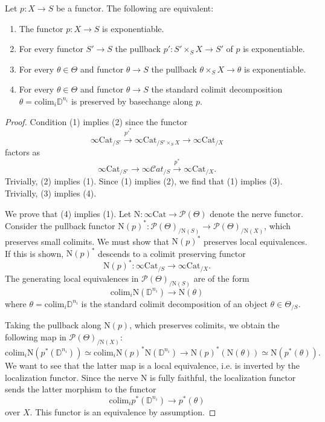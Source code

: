 \documentclass[10pt,oneside]{article}
\numberwithin{equation}{section} %
\numberwithin{figure}{section} %
\theoremstyle{plain}
\theoremstyle{definition}
\newcommand{\bD}{{\mathbb D}}
\newcommand{\mP}{{\mathcal P}}
\newcommand{\N}{{\mathrm N}}
\newcommand{\colim}{\mathrm{colim}}
\newcommand{\Cat}{\mathrm{Cat}}
\newcommand{\scat}{\mathcal{C}\mathit{at}}
\begin{document}
\begin{proposition}\label{checkontheta}\label{expbase}
Let $p:X\to S$ be a functor.
The following are equivalent:

\begin{enumerate}[\normalfont(1)]\setlength{\itemsep}{-2pt}
\item The functor $p:X\to S$ is exponentiable.

\item For every functor $S' \to S$ the pullback $p':S' \times_S X\to S' $ of $p$ is exponentiable.

\item For every $\theta \in \Theta$ and functor $\theta\to S$ the pullback $ \theta \times_S X \to \theta$ is exponentiable.

\item For every $\theta \in \Theta$ and functor $\theta\to S$ the standard colimit decomposition $\theta=\colim_i\bD^{n_i}$ is preserved by basechange along $p$. 

\end{enumerate}
\end{proposition}

\begin{proof}

Condition (1) implies (2) since the functor $$\infty\Cat_{/S'}\xrightarrow{{p'}^*} \infty\Cat_{/S' \times_S X} \to \infty\Cat_{/X}$$ factors as
$$\infty\Cat_{/S'}\to \infty\scat_{/S} \xrightarrow{p^*} \infty\Cat_{/X}.$$
Trivially, (2) implies (1).
Since (1) implies (2), we find that (1) implies (3).
Trivially, (3) implies (4).

We prove that (4) implies (1).
Let $\N: \infty\Cat \to \mP(\Theta)$ denote the nerve functor.
Consider the pullback functor $\N(p)^*:\mP(\Theta)_{/\N(S)}\to \mP(\Theta)_{/\N(X)}$, which preserves small colimits.
We must show that $\N(p)^*$ preserves local equivalences. If this is shown, $\N(p)^*$ descends to a colimit preserving functor $$ \N(p)^*:\infty\Cat_{/S}\to\infty\Cat_{/X}.$$
The generating local equivalences in $\mP(\Theta)_{/\N(S)}$ are of the form
\[
\colim_i \N(\bD^{n_i})\to\N(\theta)
\]
where $\theta=\colim_i \bD^{n_i}$ is the standard colimit decomposition of an object $\theta\in\Theta_{/S}$.

Taking the pullback along $\N(p)$, which preserves colimits, we obtain the following map in $\mP(\Theta)_{/\N(X)}$:
\[
\colim_i \N(p^*(\bD^{n_i}))\simeq\colim_i \N(p)^*\N(\bD^{n_i})\to\N(p)^*(\N(\theta)) \simeq \N(p^*(\theta)) .
\]
We want to see that the latter map is a local equivalence, i.e. is inverted by the localization functor. Since the nerve $\N$ is fully faithful, the localization functor sends the latter morphism to the functor 
\[
\colim_i p^*(\bD^{n_i}) \to p^*(\theta)
\]
over $X.$
This functor is an equivalence by assumption.
\end{proof}
\end{document}
